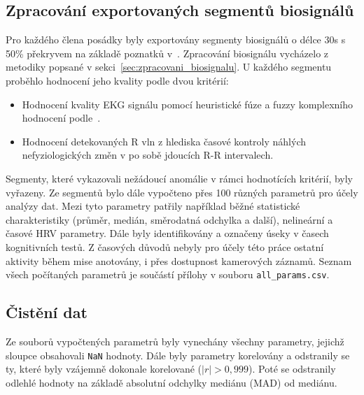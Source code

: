 \subsection{Zpracování exportovaných segmentů biosignálů}
\label{subsec:prezpracovani_segmentu}
Pro každého člena posádky byly exportovány segmenty biosignálů o délce 30s s
50\% překryvem na základě poznatků
v~\cite{Castaldo2019,Kim2021,Pecchia2018,Shaffer2020,Tervonen2021}. Zpracování
biosignálu vycházelo z metodiky popsané v sekci~\ref{sec:zpracovani_biosignalu}.
U každého segmentu proběhlo hodnocení jeho kvality podle dvou kritérií:
\begin{itemize}
      \item Hodnocení kvality \gls{EKG} signálu pomocí heuristické fúze a fuzzy
            komplexního hodnocení podle~\cite{Zhao2018}.
      \item Hodnocení detekovaných R vln z hlediska časové kontroly náhlých
            nefyziologických změn v po sobě jdoucích R-R intervalech.
\end{itemize}
Segmenty, které vykazovali nežádoucí anomálie v rámci hodnotících kritérií, byly
vyřazeny. Ze segmentů bylo dále vypočteno přes 100 různých parametrů pro účely
analýzy dat. Mezi tyto parametry patřily například běžné statistické
charakteristiky (průměr, medián, směrodatná odchylka a další), nelineární a
časové \gls{HRV} parametry. Dále byly identifikovány a označeny úseky v časech
kognitivních testů. Z časových důvodů nebyly pro účely této práce ostatní
aktivity během mise anotovány, i přes dostupnost kamerových záznamů. Seznam
všech počítaných parametrů je součástí přílohy v souboru
\texttt{all\_params.csv}. 

\subsection{Čistění dat}
\label{subsec:cisteni_dat}
Ze souborů vypočtených parametrů byly vynechány všechny parametry, jejichž
sloupce obsahovali \texttt{NaN} hodnoty. Dále byly parametry korelovány a
odstranily se ty, které byly vzájemně dokonale korelované ($|r| > 0,999$). Poté
se odstranily odlehlé hodnoty na základě absolutní odchylky mediánu (MAD) od
mediánu.

